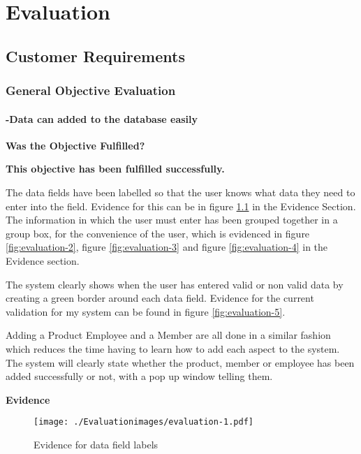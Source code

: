 \chapter{Evaluation}

\section{Customer Requirements}

\subsection{General Objective Evaluation}

\label{general}
\subsubsection{-Data can added to the database easily}
\textbf{Was the Objective Fulfilled?} \newline

\textbf{\large{This objective has been fulfilled successfully.}}

The data fields have been labelled so that the user knows what data they need to enter into the field. Evidence for this can be in figure \ref{fig:evaluation-1} in the Evidence Section. The information in which the user must enter has been grouped together in a group box, for the convenience of the user, which is evidenced in figure \ref{fig:evaluation-2}, figure \ref{fig:evaluation-3} and figure \ref{fig:evaluation-4} in the Evidence section.


The system clearly shows when the user has entered valid or non valid data by creating a green border around each data field. Evidence for the current validation for my system can be found in figure \ref{fig:evaluation-5}.

Adding a Product Employee and a Member are all done in a similar fashion which reduces the time having to learn how to add each aspect to the system. The system will clearly state whether the product, member or employee has been added successfully or not, with a pop up window telling them.\newline

\pagebreak
\textbf{Evidence} \newline

\begin{figure}[H]
\caption{Evidence for data field labels} \label{fig:evaluation-1}
\hfill\texttt{[image: ./Evaluationimages/evaluation-1.pdf]}
\end{figure}

